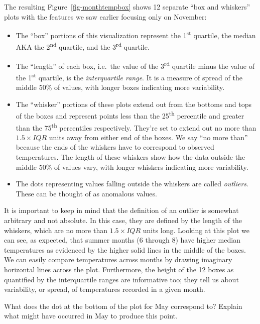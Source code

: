 \documentclass[
  letterpaper,
  DIV=11,
  numbers=noendperiod]{scrreprt}
\theoremstyle{definition}
\theoremstyle{remark}
\begin{document}
The resulting Figure~\ref{fig-monthtempbox} shows 12 separate ``box and
whiskers'' plots with the features we saw earlier focusing only on
November:

\begin{itemize}
\item
  The ``box'' portions of this visualization represent the
  1\textsuperscript{st} quartile, the median AKA the
  2\textsuperscript{nd} quartile, and the 3\textsuperscript{rd}
  quartile.
\item
  The ``length'' of each box, i.e.~the value of the
  3\textsuperscript{rd} quartile minus the value of the
  1\textsuperscript{st} quartile, is the \emph{interquartile range}. It
  is a measure of spread of the middle 50\% of values, with longer boxes
  indicating more variability.
\item
  The ``whisker'' portions of these plots extend out from the bottoms
  and tops of the boxes and represent points less than the
  25\textsuperscript{th} percentile and greater than the
  75\textsuperscript{th} percentiles respectively. They're set to extend
  out no more than \(1.5 \times IQR\) units away from either end of the
  boxes. We say ``no more than'' because the ends of the whiskers have
  to correspond to observed temperatures. The length of these whiskers
  show how the data outside the middle 50\% of values vary, with longer
  whiskers indicating more variability.
\item
  The dots representing values falling outside the whiskers are called
  \emph{outliers}. These can be thought of as anomalous values.
\end{itemize}

It is important to keep in mind that the definition of an outlier is
somewhat arbitrary and not absolute. In this case, they are defined by
the length of the whiskers, which are no more than \(1.5 \times IQR\)
units long. Looking at this plot we can see, as expected, that summer
months (6 through 8) have higher median temperatures as evidenced by the
higher solid lines in the middle of the boxes. We can easily compare
temperatures across months by drawing imaginary horizontal lines across
the plot. Furthermore, the height of the 12 boxes as quantified by the
interquartile ranges are informative too; they tell us about
variability, or spread, of temperatures recorded in a given month.

\begin{tcolorbox}[enhanced jigsaw, coltitle=black, toprule=.15mm, bottomtitle=1mm, breakable, leftrule=.75mm, title={{🎯} Learning Check 2.22}, opacitybacktitle=0.6, colback=white, rightrule=.15mm, opacityback=0, toptitle=1mm, colbacktitle=quarto-callout-tip-color!10!white, colframe=quarto-callout-tip-color-frame, titlerule=0mm, arc=.35mm, bottomrule=.15mm, left=2mm]
What does the dot at the bottom of the plot for May correspond to?
Explain what might have occurred in May to produce this point.
\end{tcolorbox}
\end{document}
